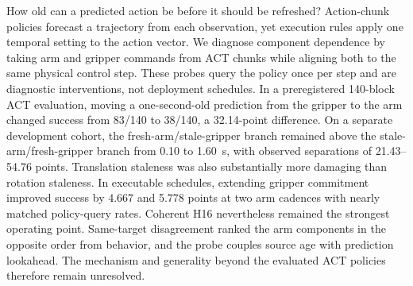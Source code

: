 How old can a predicted action be before it should be refreshed? Action-chunk
policies forecast a trajectory from each observation, yet execution rules
apply one temporal setting to the action vector. We diagnose component
dependence by taking arm and gripper commands from ACT
chunks while aligning both to the same physical control step.
These probes query the policy once per step and are diagnostic
interventions, not deployment schedules. In a preregistered 140-block ACT
evaluation, moving a one-second-old prediction from the gripper to the arm
changed success from 83/140 to 38/140, a 32.14-point difference. On a separate
development cohort, the fresh-arm/stale-gripper branch remained above the
stale-arm/fresh-gripper branch from 0.10 to 1.60~s, with observed separations of
21.43--54.76 points. Translation staleness was also substantially more damaging
than rotation staleness. In executable schedules, extending gripper commitment
improved success by 4.667 and 5.778 points at two arm cadences with nearly
matched policy-query rates. Coherent H16 nevertheless remained the strongest
operating point. Same-target disagreement ranked the arm
components in the opposite order from behavior, and the probe couples source
age with prediction lookahead. The mechanism and generality beyond the
evaluated ACT policies therefore remain unresolved.
